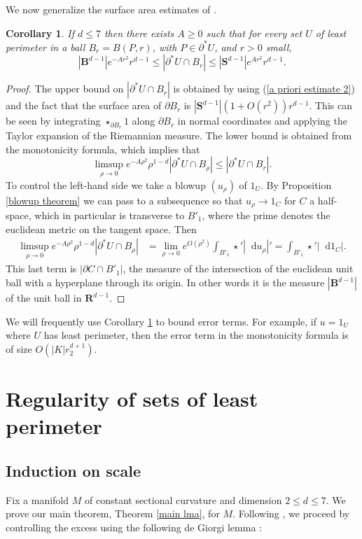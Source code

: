 \documentclass[final,12pt, leqno]{brownthesis}
\newcommand{\RR}{\mathbf{R}}
\newcommand{\Sph}{\mathbf S}
\newcommand{\Ball}{\mathbf{B}}
\newcommand*\dif{\mathop{}\!\mathrm{d}}
\newtheorem{corollary}[theorem]{Corollary}
\theoremstyle{definition}
\numberwithin{equation}{section}
\begin{document}
We now generalize the surface area estimates of \cite[Remark 5.13]{Giusti77}.

\begin{corollary}\label{doubling dimension}
If $d \leq 7$ then there exists $A \geq 0$ such that for every set $U$ of least perimeter in a ball $B_r = B(P, r)$, with $P \in \partial^* U$, and $r > 0$ small,
$$|\Ball^{d - 1}|e^{-Ar^2}r^{d - 1} \leq |\partial^*U \cap B_r| \leq |\Sph^{d - 1}|e^{Ar^2} r^{d - 1}.$$
\end{corollary}
\begin{proof}
The upper bound on $|\partial^* U \cap B_r|$ is obtained by using (\ref{a priori estimate 2}) and the fact that the surface area of $\partial B_r$ is $|\Sph^{d - 1}|(1 + O(r^2))r^{d - 1}$.
This can be seen by integrating $\star_{\partial B_r} 1$ along $\partial B_r$ in normal coordinates and applying the Taylor expansion of the Riemannian measure.
The lower bound is obtained from the monotonicity formula, which implies that
$$\limsup_{\rho \to 0} e^{-A\rho^2} \rho^{1 - d} |\partial^* U \cap B_\rho| \leq |\partial^* U \cap B_r|.$$
To control the left-hand side we take a blowup $(u_\rho)$ of $1_U$.
By Proposition \ref{blowup theorem} we can pass to a subsequence so that $u_\rho \to 1_C$ for $C$ a half-space, which in particular is transverse to $B'_1$, where the prime denotes the euclidean metric on the tangent space.
Then
\begin{align*}
\limsup_{\rho \to 0} e^{-A\rho^2} \rho^{1 - d} |\partial^* U \cap B_\rho| &= \lim_{\rho \to 0} e^{O(\rho^2)} \int_{B'_1} \star'|\dif u_\rho|' = \int_{B'_1} \star'|\dif 1_C|.
\end{align*}
This last term is $|\partial C \cap B'_1|$, the measure of the intersection of the euclidean unit ball with a hyperplane through its origin.
In other words it is the measure $|\Ball^{d - 1}|$ of the unit ball in $\RR^{d - 1}$.
\end{proof}

We will frequently use Corollary \ref{doubling dimension} to bound error terms.
For example, if $u = 1_U$ where $U$ has least perimeter, then the error term in the monotonicity formula is of size $O(|K|r_2^{d + 1})$.



\section{Regularity of sets of least perimeter}\label{Plateau section}
\subsection{Induction on scale}
Fix a manifold $M$ of constant sectional curvature and dimension $2 \leq d \leq 7$.
We prove our main theorem, Theorem \ref{main lma}, for $M$.
Following \cite{Miranda66,Giusti77,deGiorgi61}, we proceed by controlling the excess using the following de Giorgi lemma \cite[Theorem 8.1]{Giusti77}:
\end{document}
